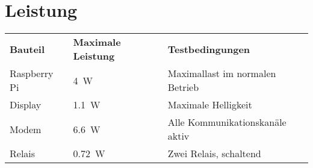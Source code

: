 \documentclass[10pt,a4paper,landscape]{article}
\begin{document}
	\section{Leistung}
	\begin{tabular}{lll}
		\textbf{Bauteil} & \textbf{Maximale Leistung} & \textbf{Testbedingungen} \\
		Raspberry Pi & \SI{4}{W} & Maximallast im normalen Betrieb\cite{ref:raspipower} \\
		Display & \SI{1.1}{W} & Maximale Helligkeit\cite{datasheet:display} \\
		Modem & \SI{6.6}{W} & Alle Kommunikationskanäle aktiv \cite{ref:modemrefdesign} \\
		Relais & \SI{0.72}{W} & Zwei Relais, schaltend \cite{datasheet:finder36relais} \\
	\end{tabular}
\end{document}
